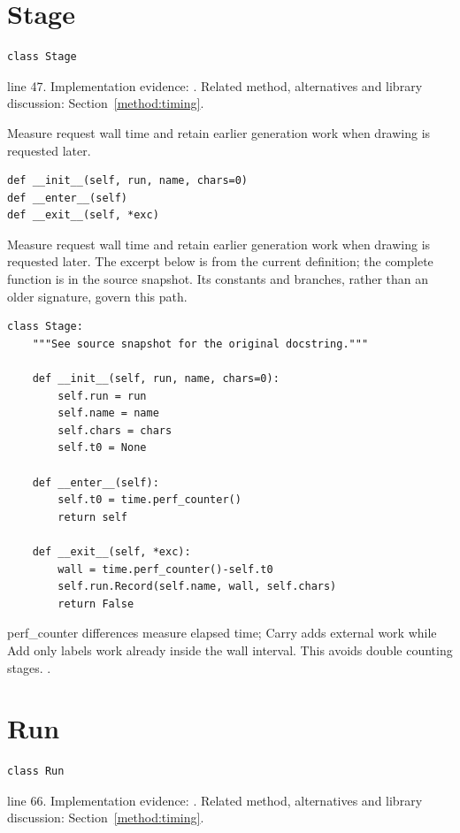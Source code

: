 \section{Stage}\label{fn:timing:Stage}
\begin{lstlisting}[style=sig]
class Stage
\end{lstlisting}
 line 47. Implementation evidence: \cite{code2026}. Related method, alternatives and library discussion: Section~\ref{method:timing}.


Measure request wall time and retain earlier generation work when drawing is requested later.


\begin{lstlisting}[style=plain]
def __init__(self, run, name, chars=0)
def __enter__(self)
def __exit__(self, *exc)
\end{lstlisting}
Measure request wall time and retain earlier generation work when drawing is requested later. The excerpt below is from the current definition; the complete function is in the source snapshot. Its constants and branches, rather than an older signature, govern this path.


\begin{lstlisting}[style=plain]
class Stage:
    """See source snapshot for the original docstring."""

    def __init__(self, run, name, chars=0):
        self.run = run
        self.name = name
        self.chars = chars
        self.t0 = None

    def __enter__(self):
        self.t0 = time.perf_counter()
        return self

    def __exit__(self, *exc):
        wall = time.perf_counter()-self.t0
        self.run.Record(self.name, wall, self.chars)
        return False
\end{lstlisting}
perf\_counter differences measure elapsed time; Carry adds external work while Add only labels work already inside the wall interval. This avoids double counting stages. \cite{pythontime,code2026}.


\section{Run}\label{fn:timing:Run}
\begin{lstlisting}[style=sig]
class Run
\end{lstlisting}
 line 66. Implementation evidence: \cite{code2026}. Related method, alternatives and library discussion: Section~\ref{method:timing}.


